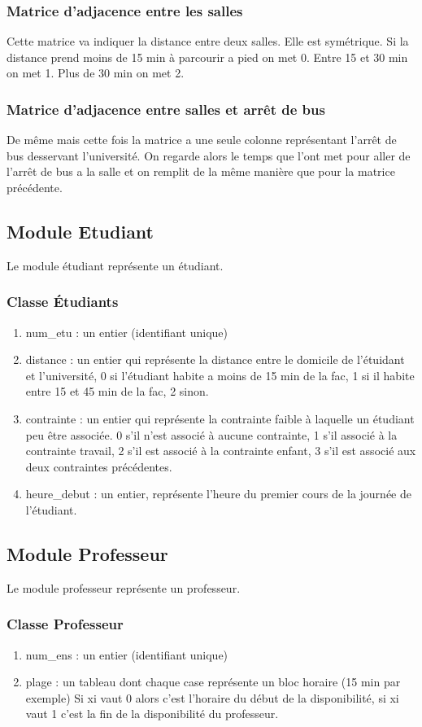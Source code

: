 \documentclass[a4paper,11pt]{article}
\begin{document}
		\subsubsection{Matrice d'adjacence entre les salles}
	Cette matrice va indiquer la distance entre deux salles. Elle est symétrique. Si la distance prend moins de 15 min à parcourir a pied on met 0.
	Entre 15 et 30 min on met 1. Plus de 30 min on met 2.
		\subsubsection{Matrice d'adjacence entre salles et arrêt de bus}
		De même mais cette fois la matrice a une seule colonne représentant l'arrêt de bus desservant l'université.
		On regarde alors le temps que l'ont met pour aller de l'arrêt de bus a la salle et on remplit de la même manière que pour la matrice précédente.
	\subsection{Module Etudiant}
		Le module étudiant représente un étudiant.
		\subsubsection{Classe Étudiants}
		\begin{enumerate}
			\item num\_etu : un entier (identifiant unique)
			\item distance : un entier qui représente la distance entre le domicile de l'étuidant et l'université, 0 si l'étudiant habite a moins de 15 min de la fac, 1 si il habite entre 15 et 45 min de la fac, 2 sinon.
			\item contrainte : un entier qui représente la contrainte faible à laquelle un étudiant peu être associée. 0 s'il n'est associé à aucune contrainte, 1 s'il associé à la contrainte travail, 2 s'il est associé à la contrainte enfant, 3 s'il est associé aux deux contraintes précédentes. 
			\item heure\_debut : un entier, représente l'heure du premier cours de la journée de l'étudiant.
			\end{enumerate}
	\subsection{Module Professeur}
		Le module professeur représente un professeur.
		\subsubsection{Classe Professeur}
		\begin{enumerate}
			\item num\_ens : un entier (identifiant unique)
			\item plage : un tableau dont chaque case représente un bloc horaire (15 min par exemple)
			Si xi vaut 0 alors c'est l'horaire du début de la disponibilité, si xi vaut 1 c'est la fin de la disponibilité du professeur.
			\end{enumerate}
\end{document}
